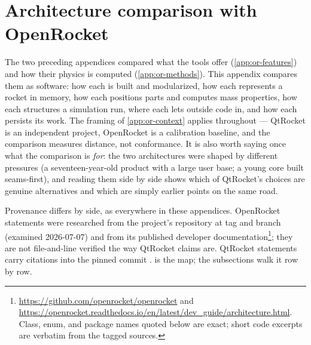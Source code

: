 \section{Architecture comparison with OpenRocket}\label{app:or-architecture}

The two preceding appendices compared what the tools offer (\cref{app:or-features}) and how
their physics is computed (\cref{app:or-methods}). This appendix compares them as software:
how each is built and modularized, how each represents a rocket in memory, how each
positions parts and computes mass properties, how each structures a simulation run, where
each lets outside code in, and how each persists its work. The framing of
\cref{app:or-context} applies throughout --- QtRocket is an independent project, OpenRocket
is a calibration baseline, and the comparison measures distance, not conformance. It is also
worth saying once what the comparison is \emph{for}: the two architectures were shaped by
different pressures (a seventeen-year-old product with a large user base; a young core built
seams-first), and reading them side by side shows which of QtRocket's choices are genuine
alternatives and which are simply earlier points on the same road.

Provenance differs by side, as everywhere in these appendices. OpenRocket statements were
researched from the project's repository at tag  and branch
 (examined 2026-07-07) and from its published developer
documentation\footnote{\url{https://github.com/openrocket/openrocket} and
\url{https://openrocket.readthedocs.io/en/latest/dev_guide/architecture.html}. Class, enum,
and package names quoted below are exact; short code excerpts are verbatim from the tagged
sources.}; they are not file-and-line verified the way QtRocket claims are. QtRocket
statements carry  citations into the pinned commit .
 is the map; the subsections walk it row by row.

